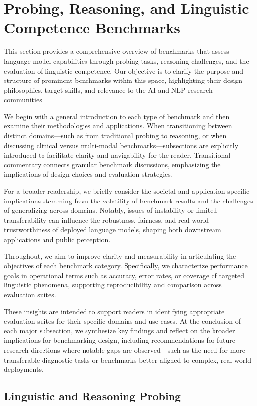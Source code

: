\documentclass[sigconf]{acmart}
\begin{document}
\section{Probing, Reasoning, and Linguistic Competence Benchmarks}

This section provides a comprehensive overview of benchmarks that assess language model capabilities through probing tasks, reasoning challenges, and the evaluation of linguistic competence. Our objective is to clarify the purpose and structure of prominent benchmarks within this space, highlighting their design philosophies, target skills, and relevance to the AI and NLP research communities. 

We begin with a general introduction to each type of benchmark and then examine their methodologies and applications. When transitioning between distinct domains—such as from traditional probing to reasoning, or when discussing clinical versus multi-modal benchmarks—subsections are explicitly introduced to facilitate clarity and navigability for the reader. Transitional commentary connects granular benchmark discussions, emphasizing the implications of design choices and evaluation strategies.

For a broader readership, we briefly consider the societal and application-specific implications stemming from the volatility of benchmark results and the challenges of generalizing across domains. Notably, issues of instability or limited transferability can influence the robustness, fairness, and real-world trustworthiness of deployed language models, shaping both downstream applications and public perception.

Throughout, we aim to improve clarity and measurability in articulating the objectives of each benchmark category. Specifically, we characterize performance goals in operational terms such as accuracy, error rates, or coverage of targeted linguistic phenomena, supporting reproducibility and comparison across evaluation suites.

These insights are intended to support readers in identifying appropriate evaluation suites for their specific domains and use cases. At the conclusion of each major subsection, we synthesize key findings and reflect on the broader implications for benchmarking design, including recommendations for future research directions where notable gaps are observed—such as the need for more transferable diagnostic tasks or benchmarks better aligned to complex, real-world deployments.

\subsection{Linguistic and Reasoning Probing}
\end{document}
